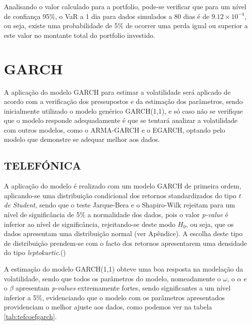 \documentclass[
  12pt,
  a4paper,
  openany]{book}
\newenvironment{Shaded}{\begin{snugshade}}{\end{snugshade}}
\newcommand{\CommentTok}[1]{\textcolor[rgb]{0.56,0.35,0.01}{\textit{#1}}}
\newcommand{\DataTypeTok}[1]{\textcolor[rgb]{0.13,0.29,0.53}{#1}}
\newcommand{\DecValTok}[1]{\textcolor[rgb]{0.00,0.00,0.81}{#1}}
\newcommand{\KeywordTok}[1]{\textcolor[rgb]{0.13,0.29,0.53}{\textbf{#1}}}
\newcommand{\NormalTok}[1]{#1}
\newcommand{\OperatorTok}[1]{\textcolor[rgb]{0.81,0.36,0.00}{\textbf{#1}}}
\newcommand{\OtherTok}[1]{\textcolor[rgb]{0.56,0.35,0.01}{#1}}
\newcommand{\StringTok}[1]{\textcolor[rgb]{0.31,0.60,0.02}{#1}}
\begin{document}
\normalsize

Analisando o valor calculado para a portfolio, pode-se verificar que para um nível de confiança 95\%, o VaR a 1 dia para dados simulados a 80 dias é de \ensuremath{9.12\times 10^{-4}}, ou seja, existe uma probabilidade de 5\% de ocorrer uma perda igual ou superior a este valor no montante total do portfolio investido.

\hypertarget{garch}{%
\section{GARCH}\label{garch}}

A aplicação do modelo GARCH para estimar a volatilidade será aplicado de acordo com a verificação dos pressupostos e da estimação dos parâmetros, sendo inicialmente utilizado o modelo genérico GARCH(1,1), e só caso não se verifique que o modelo responde adequadamente é que se tentará analizar a volatilidade com outros modelos, como o ARMA-GARCH e o EGARCH, optando pelo modelo que demonstre se adequar melhor aos dados.

\hypertarget{telefuxf3nica}{%
\subsection{TELEFÓNICA}\label{telefuxf3nica}}

A aplicação do modelo é realizado com um modelo GARCH de primeira ordem, aplicando-se uma distribuição condicional dos retornos standardizados do tipo \emph{t de Student}, sendo que o teste Jarque-Bera e o Shapiro-Wilk rejeitam para um nível de significância de 5\% a normalidade dos dados, pois o valor \emph{p-value} é inferior ao nível de significância, rejeitando-se deste modo \(H_0\), ou seja, que os dados apresentam uma distribuição normal (ver Apêndice). A escolha deste tipo de distribuição prendem-se com o facto dos retornos apresentarem uma densidade do tipo \emph{leptokurtic}.(\citet{rvol})

A estimação do modelo GARCH(1,1) obteve uma boa resposta na modelação da volatilidade, sendo que todos os parâmetros do modelo, nomeadamente o \(\omega\), o \(\alpha\) e o \(\beta\) apresentam \emph{p-values} extremamente fortes, sendo significantes a um nível inferior a 5\%, evidenciando que o modelo com os parâmetros apresentados providenciam o melhor ajuste aos dados, como podemos ver na tabela \ref{tab:tefcoefgarch}.

\scriptsize

\begin{Shaded}
\end{Shaded}
\end{document}
